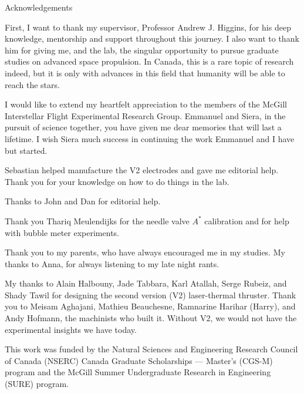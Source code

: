 \begin{plainchp}{Acknowledgements}

    First, I want to thank my supervisor, Professor Andrew J. Higgins, for his deep knowledge, mentorship and support throughout this journey. I also want to thank him for giving me, and the lab, the singular opportunity to pursue graduate studies on advanced space propulsion. In Canada, this is a rare topic of research indeed, but it is only with advances in this field that humanity will be able to reach the stars.

    I would like to extend my heartfelt appreciation to the members of the McGill Interstellar Flight Experimental Research Group. Emmanuel and Siera, in the pursuit of science together, you have given me dear memories that will last a lifetime. I wish Siera much success in continuing the work Emmanuel and I have but started.

    Sebastian helped manufacture the V2 electrodes and gave me editorial help. Thank you for your knowledge on how to do things in the lab.

    Thanks to John and Dan for editorial help.

    Thank you Thariq Meulendijks for the needle valve $A^*$ calibration and for help with bubble meter experiments.
    
    Thank you to my parents, who have always encouraged me in my studies. My thanks to Anna, for always listening to my late night rants.

    My thanks to Alain Halbouny, Jade Tabbara, Karl Atallah, Serge Rubeiz, and Shady Tawil for designing the second version (V2) laser-thermal thruster. Thank you to Meisam Aghajani, Mathieu Beauchesne, Ramnarine Harihar (Harry), and Andy Hofmann, the machinists who built it. Without V2, we would not have the experimental insights we have today.

    This work was funded by the Natural Sciences and Engineering Research Council of Canada (NSERC) Canada Graduate Scholarships — Master’s (CGS-M) program and the McGill Summer Undergraduate Research in Engineering (SURE) program.

\end{plainchp}